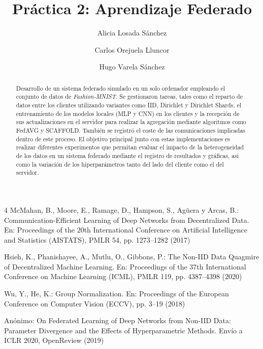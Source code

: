 \documentclass[runningheads]{llncs}
\begin{document}
\title{Práctica 2: Aprendizaje Federado}

\author{Alicia Losada Sánchez \and
Carlos Orejuela Lluncor \and
Hugo Varela Sánchez}



\maketitle

\begin{abstract}
Desarrollo de un sistema federado simulado en un solo ordenador empleando el conjunto
de datos de \textit{Fashion-MNIST}. Se gestionaron tareas, tales como el reparto de datos 
entre los clientes utilizando variantes como IID, Dirichlet y Dirichlet Shards, el entrenamiento 
de los modelos locales (MLP y CNN) en los clientes y la recepción de sus actualizaciones en el 
servidor para realizar la agregación mediante algoritmos como FedAVG y SCAFFOLD. También se 
registró el coste de las comunicaciones implicadas dentro de este proceso. El objetivo principal 
junto con estas implementaciones es realizar diferentes experimentos que permitan evaluar el 
impacto de la heterogeneidad de los datos en un sistema federado mediante el registro de resultados 
y gráficas, así como la variación de los hiperparámetros tanto del lado del cliente como el del servidor.

\end{abstract}













\renewcommand{\refname}{Referencias}
\begin{thebibliography}{4}
 McMahan, B., Moore, E., Ramage, D., Hampson, S., Agüera y Arcas, B.: Communication-Efficient
Learning of Deep Networks from Decentralized Data. En: Proceedings of the 20th International Conference on
Artificial Intelligence and Statistics (AISTATS), PMLR 54, pp. 1273--1282 (2017)

 Hsieh, K., Phanishayee, A., Mutlu, O., Gibbons, P.: The Non-IID Data Quagmire of Decentralized
Machine Learning. En: Proceedings of the 37th International Conference on Machine Learning (ICML), PMLR 119,
pp. 4387--4398 (2020)

 Wu, Y., He, K.: Group Normalization. En: Proceedings of the European Conference on Computer
Vision (ECCV), pp. 3--19 (2018)

 Anónimo: On Federated Learning of Deep Networks from Non-IID Data: Parameter Divergence and
the Effects of Hyperparametric Methods. Envío a ICLR 2020, OpenReview (2019)
\end{thebibliography}
\end{document}
